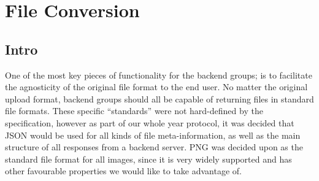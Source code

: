 \section{File Conversion}
\subsection{Intro}
One of the most key pieces of functionality for the backend groups; is to facilitate the agnosticity of the
original file format to the end user. No matter the original upload format, backend groups should all be
capable of returning files in standard file formats.
These specific ``standards'' were not hard-defined by the specification, however as part of our whole year
protocol, it was decided that JSON would be used for all kinds of file meta-information, as well as the
main structure of all responses from a backend server. PNG was decided upon as the standard file format
for all images, since it is very widely supported and has other favourable properties we would like to
take advantage of.\\

